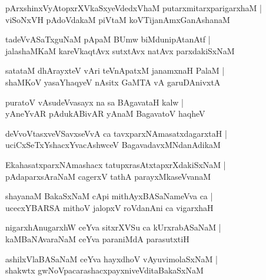 \documentclass[twoside,12pt,openright]{book}
\newcounter{shloka}[chapter]
\begin{document}
\begin{shloka}%
pArxshinxVyAtopxrXVkaSxyeVdedxVhaM putarxmitarxparigarxhaM |\\
viSoNxVH pAdoVdakaM piVtaM koVTijanAmxGanAshanaM 
\end{shloka}

\begin{shloka}%
tadeVvASaTxguNaM pApaM BUmw biMdunipAtanAtf |\\
jalashaMKaM  kareVkaqtAvx sutxtAvx natAvx parxdakiSxNaM 
\end{shloka}

\begin{shloka}%
satataM dhArayxteV vAri teVnApatxM janamxnaH PalaM |\\
shaMKoV yasaYhaqyeV nAsitx GaMTA vA garuDAnivxtA 
\end{shloka}

\begin{shloka}%
puratoV vAsudeVvasayx na sa BAgavataH kalw |\\
yAneYvAR pAdukABivAR yAnaM BagavatoV haqheV 
\end{shloka}

\begin{shloka}%
deVvoVtasxveVSavxseVvA ca tavxparxNAmasatxdagarxtaH |\\
uciCxSeTxYshacxYvacAshwceV BagavadavxMNdanAdikaM 
\end{shloka}

\begin{shloka}%
EkahasatxparxNAmashacx tatupxrasAtxtapxrXdakiSxNaM |\\
pAdaparxsAraNaM  cagerxV tathA parayxMkaseVvanaM 
\end{shloka}

\begin{shloka}%
shayanaM BakaSxNaM cApi mithAyxBASaNameVva ca |\\
ucecxYBARSA mithoV jalopxV roVdanAni ca vigarxhaH
\end{shloka}

\begin{shloka}%
nigarxhAnugarxhW ceYva sitxrXVSu ca kUrxrabASaNaM |\\
kaMBaNAvaraNaM ceYva paraniMdA parasutxtiH 
\end{shloka}

\begin{shloka}%
ashilxVlaBASaNaM ceYva hayxdhoV vAyuvimolaSxNaM |\\
shakwtx gwNoVpacarashacxpayxniveVditaBakaSxNaM 
\end{shloka}
\end{document}
